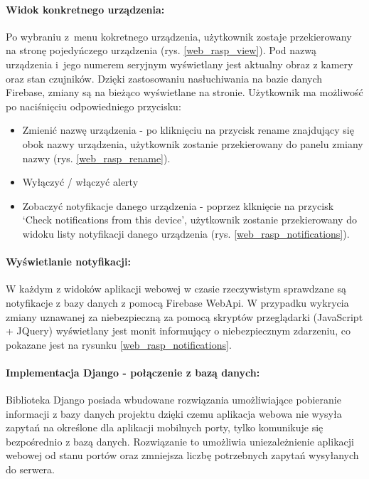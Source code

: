 \paragraph{Widok konkretnego urządzenia:} Po wybraniu z~menu kokretnego urządzenia, użytkownik zostaje przekierowany na stronę pojedyńczego urządzenia (rys. \ref{web_rasp_view}). Pod nazwą urządzenia i~jego numerem seryjnym wyświetlany jest aktualny obraz z kamery oraz stan czujników. Dzięki zastosowaniu nasłuchiwania na bazie danych Firebase, zmiany są na bieżąco wyświetlane na stronie. Użytkownik ma możliwość po naciśnięciu odpowiedniego przycisku:
\begin{itemize}
\item Zmienić nazwę urządzenia - po kliknięciu na przycisk rename znajdujący się obok nazwy urządzenia, użytkownik zostanie przekierowany do panelu zmiany nazwy (rys. \ref{web_rasp_rename}).
\item Wyłączyć / włączyć alerty 
\item Zobaczyć notyfikacje danego urządzenia - poprzez klknięcie na przycisk `Check notifications from this device', użytkownik zostanie przekierowany do widoku listy notyfikacji danego urządzenia (rys. \ref{web_rasp_notifications}).
\end{itemize}

\paragraph{Wyświetlanie notyfikacji:} W każdym z widoków aplikacji webowej w czasie rzeczywistym sprawdzane są notyfikacje z bazy danych z pomocą Firebase WebApi. W przypadku wykrycia zmiany uznawanej za niebezpieczną za pomocą skryptów przeglądarki (JavaScript + JQuery) wyświetlany jest monit informujący o niebezpiecznym zdarzeniu, co pokazane jest na rysunku \ref{web_rasp_notifications}.  

\paragraph{Implementacja Django - połączenie z bazą danych:}
Biblioteka Django posiada wbudowane rozwiązania umożliwiające pobieranie informacji z bazy danych projektu dzięki czemu aplikacja webowa nie wysyła zapytań na określone dla aplikacji mobilnych porty, tylko komunikuje się bezpośrednio z bazą danych. Rozwiązanie to umożliwia uniezależnienie aplikacji webowej od stanu portów oraz zmniejsza liczbę potrzebnych zapytań wysyłanych do serwera.
